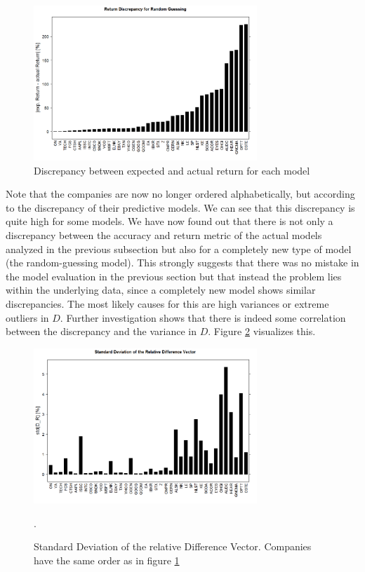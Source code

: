 \begin{figure}[h]
	\centering
  	\includegraphics[width=0.75\textwidth]{returnDiscrepancy}
	\caption{Discrepancy between expected and actual return for each model}
	\label{fig_returnDiscrepancy}
\end{figure}

Note that the companies are now no longer ordered alphabetically, but according to the discrepancy of their predictive models. We can see that this discrepancy is quite high for some models. We have now found out that there is not only a discrepancy between the accuracy and return metric of the actual models analyzed in the previous subsection but also for a completely new type of model (the random-guessing model). This strongly suggests that there was no mistake in the model evaluation in the previous section but that instead the problem lies within the underlying data, since a completely new model shows similar discrepancies. The most likely causes for this are high variances or extreme outliers in $D$. Further investigation shows that there is indeed some correlation between the discrepancy and the variance in $D$. Figure \ref{fig_stdDiscrepancy} visualizes this.

\begin{figure}[h]
	\centering
  	\includegraphics[width=0.75\textwidth]{stdDiscrepancy}
	\caption{Standard Deviation of the relative Difference Vector. Companies have the same order as in figure \ref{fig_returnDiscrepancy}}.
	\label{fig_stdDiscrepancy}
\end{figure}

